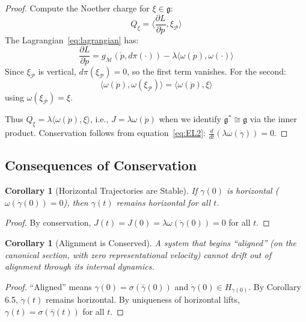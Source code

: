 \documentclass[11pt]{article}
\newtheorem{corollary}[theorem]{Corollary}
\begin{document}
\begin{proof}
Compute the Noether charge for $\xi \in \mathfrak{g}$:
\[
Q_\xi = \langle \frac{\partial L}{\partial \dot{p}}, \xi_{\mathcal{P}} \rangle
\]
The Lagrangian~\eqref{eq:lagrangian} has:
\[
\frac{\partial L}{\partial \dot{p}} = g_{\mathcal{M}}(\check{p}, d\pi(\cdot)) - \lambda\langle\omega(\dot{p}), \omega(\cdot)\rangle
\]
Since $\xi_{\mathcal{P}}$ is vertical, $d\pi(\xi_{\mathcal{P}}) = 0$, so the first term vanishes. For the second:
\[
\langle\omega(\dot{p}), \omega(\xi_{\mathcal{P}})\rangle = \langle\omega(\dot{p}), \xi\rangle
\]
using $\omega(\xi_{\mathcal{P}}) = \xi$.

Thus $Q_\xi = \lambda\langle\omega(\dot{p}), \xi\rangle$, i.e., $J = \lambda\omega(\dot{p})$ when we identify $\mathfrak{g}^* \cong \mathfrak{g}$ via the inner product.
Conservation follows from equation~\eqref{eq:EL2}: $\frac{d}{dt}(\lambda\omega(\dot{\gamma})) = 0$.
\end{proof}

\subsection{Consequences of Conservation}

\begin{corollary}[Horizontal Trajectories are Stable]
If $\gamma(0)$ is horizontal ($\omega(\dot{\gamma}(0)) = 0$), then
$\gamma(t)$ remains horizontal for all $t$.
\end{corollary}

\begin{proof}
By conservation, $J(t) = J(0) = \lambda\omega(\dot{\gamma}(0)) = 0$ for all $t$.
\end{proof}

\begin{corollary}[Alignment is Conserved]
A system that begins ``aligned'' (on the canonical
section, with zero representational velocity) cannot drift out of alignment through its internal
dynamics.
\end{corollary}

\begin{proof}
``Aligned'' means $\gamma(0) = \sigma(\bar{\gamma}(0))$ and $\dot{\gamma}(0) \in H_{\gamma(0)}$. By Corollary 6.5, $\dot{\gamma}(t)$ remains
horizontal. By uniqueness of horizontal lifts, $\gamma(t) = \sigma(\bar{\gamma}(t))$ for all $t$.
\end{proof}

\end{document}
